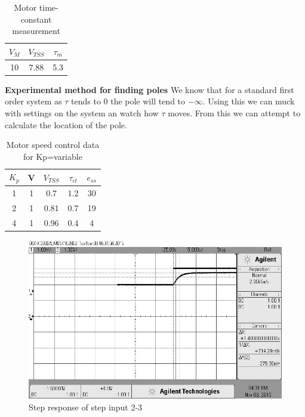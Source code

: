 \documentclass{article}
\begin{document}
\begin{table}[!htbp]
\centering
    \begin{tabular}{|c|c|c|}
        \hline
        $V_M$ & $V_{TSS}$ & $\tau_m$ \\
        \hline
        10 & 7.88 & 5.3\\
        \hline
    \end{tabular}
    \caption{Motor time-constant measurement}
\end{table}

\textbf{Experimental method for finding poles} We know that for a standard first order system as $\tau$ tends to 0 the pole will tend to $-\infty$. Using this we can muck with settings on the system an watch how $\tau$ moves. From this we can attempt to calculate the location of the pole.


\begin{table}[!htbp]
\centering
    \begin{tabular}{|c|c|c|c|c|}
        \hline
        $K_p$ & V & $V_{TSS}$ & $\tau_{cl}$ & $e_{ss}$\\
        \hline
        1 &  1 & 0.7 &  1.2 & 30\\
        \hline
        2  & 1 & 0.81 &     0.7 & 19\\
        \hline
        4  & 1 & 0.96 &     0.4 & 4\\
        \hline
    \end{tabular}
    \caption{Motor speed control data for Kp=variable}
\end{table}
\begin{figure}[!htbp]
\centering
\includegraphics[width=7in]{step_response_kp1_5_2.jpg}
\caption{Step response of step input 2-3}
\end{figure}
\end{document}
